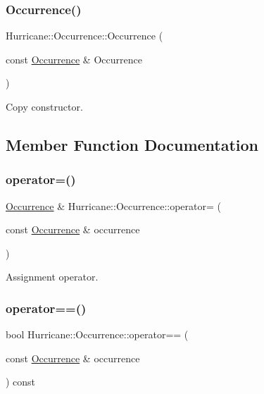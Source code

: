 \subsubsection{\texorpdfstring{Occurrence()}{Occurrence()}\hspace{0.1cm}{\footnotesize\ttfamily [3/3]}}
{\footnotesize\ttfamily Hurricane\+::\+Occurrence\+::\+Occurrence (\begin{DoxyParamCaption}\item[{const \hyperlink{classHurricane_1_1Occurrence}{Occurrence} \&}]{Occurrence }\end{DoxyParamCaption})}

Copy constructor. 

\subsection{Member Function Documentation}
\mbox{\label{classHurricane_1_1Occurrence_a389472d0d5b121a4e091511c8003cb47}} 
\subsubsection{\texorpdfstring{operator=()}{operator=()}}
{\footnotesize\ttfamily \hyperlink{classHurricane_1_1Occurrence}{Occurrence} \& Hurricane\+::\+Occurrence\+::operator= (\begin{DoxyParamCaption}\item[{const \hyperlink{classHurricane_1_1Occurrence}{Occurrence} \&}]{occurrence }\end{DoxyParamCaption})}

Assignment operator. \mbox{\label{classHurricane_1_1Occurrence_accae7f6611cb5985478d58fc793dc3e0}} 
\subsubsection{\texorpdfstring{operator==()}{operator==()}}
{\footnotesize\ttfamily bool Hurricane\+::\+Occurrence\+::operator== (\begin{DoxyParamCaption}\item[{const \hyperlink{classHurricane_1_1Occurrence}{Occurrence} \&}]{occurrence }\end{DoxyParamCaption}) const}

